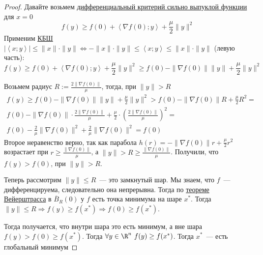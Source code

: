 \begin{proof}
  Давайте возьмем \hyperref[note:1B5A3E25-56E8-4D5E-9CF6-E2731DA77604]{дифференциальный критерий сильно выпуклой функции} для $x=0$
  \[
  f(y) \ge f(0) + \left\langle \nabla f(0); y \right\rangle + \frac{\mu}{2} \| y \|^2
  \]
  Применим \hyperref[note:D0601ACD-8C91-4A93-B0E4-AC0D529C6A5C]{КБШ} $| \left\langle x;y \right\rangle | \le \|x\| \cdot \|y\| \Leftrightarrow - \|x\| \cdot \|y\| \le   \left\langle x;y \right\rangle  \le \|x\| \cdot \|y\|$ (левую часть):
  \[
  f(y) \ge f(0) + \left\langle \nabla f(0); y\right\rangle + \frac{\mu}{2} \| y \|^2 \ge f(0) - \| \nabla f(0) \| \| y\| + \frac{\mu}{2} \| y \|^2
  \]

  Возьмем радиус $R := \frac{2 \| \nabla f(0) \|}{\mu}$, тогда, при $\|y\| > R$
  \begin{multline*}
  f(y) \ge f (0) -  \| \nabla f(0) \| \| y \| + \frac{\mu}{2} \| y \|^2 > f(0) - \| \nabla f(0) \| R + \frac{\mu}{2} R^2 = \\
   f(0) - \| \nabla f(0)\| \cdot  \frac{ 2 \| \nabla f(0)\|}{\mu} + \frac{\mu}{2} \cdot  \left( \frac{2 \| \nabla f(0) \|}{\mu} \right)^2 = \\
   f(0) - \frac{2}{\mu} \|\nabla f(0) \|^2 + \frac{2}{\mu} \| \nabla f(0) \|^2 = f(0)
  \end{multline*}
  Второе неравенство верно, так как парабола $h(r) = - \| \nabla f(0) \| r + \frac{\mu}{2} r^2$ возрастает при $r \ge \frac{\| \nabla f(0) \|}{\mu}$, а $\| y \| > R \ge \frac{\| \nabla f(0) \|}{\mu}$.
  Получили, что $f(y) > f(0)$, при $\| y \| > R$.

  Теперь рассмотрим $\| y \| \le R$~--- это замкнутый шар.
  Мы знаем, что $f$~--- дифференцируема, следовательно она непрерывна.
  Тогда по \hyperref[note:82C70263-336A-49F5-82DB-9D25C84D6A6D]{теореме Вейерштрасса} в $\overline{B}_R(0)$ у $f$ есть точка минимума на шаре $x^{*}$.
  Тогда  $\| y \| \le R \Rightarrow f(y) \ge f(x^{*}) \Rightarrow f(0) \ge f(x^{*})$.

  Тогда получается, что внутри шара это есть минимум, а вне шара $f(y) > f(0) \ge f(x^{*})$.
  Тогда $\forall y \in \R^n\ f(y) \ge f(x^{*})$.
  Тогда $x^{*}$~--- есть глобальный минимум


\end{proof}
